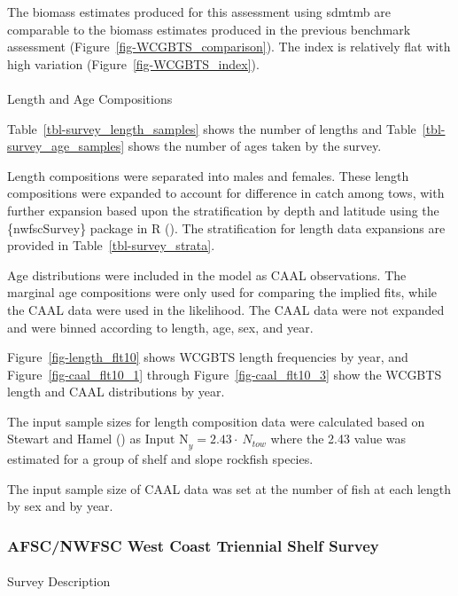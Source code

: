 \documentclass[
]{scrartcl}
\makeatletter
\let\oldparagraph\paragraph
\renewcommand{\paragraph}{
    \@ifstar
      \xxxParagraphStar
      \xxxParagraphNoStar
  }
\newcommand{\xxxParagraphStar}[1]{\oldparagraph*{#1}\mbox{}}
\newcommand{\xxxParagraphNoStar}[1]{\oldparagraph{#1}\mbox{}}
\makeatother
\begin{document}
The biomass estimates produced for this assessment using \gls{sdmtmb}
are comparable to the biomass estimates produced in the previous
benchmark assessment (Figure~\ref{fig-WCGBTS_comparison}). The index is
relatively flat with high variation (Figure~\ref{fig-WCGBTS_index}).

\paragraph{Length and Age
Compositions}\label{length-and-age-compositions}

Table~\ref{tbl-survey_length_samples} shows the number of lengths and
Table~\ref{tbl-survey_age_samples} shows the number of ages taken by the
survey.

Length compositions were separated into males and females. These length
compositions were expanded to account for difference in catch among
tows, with further expansion based upon the stratification by depth and
latitude using the \{nwfscSurvey\} package in R
(). The stratification for length data expansions are provided in
Table~\ref{tbl-survey_strata}.

Age distributions were included in the model as CAAL observations. The
marginal age compositions were only used for comparing the implied fits,
while the CAAL data were used in the likelihood. The CAAL data were not
expanded and were binned according to length, age, sex, and year.

Figure~\ref{fig-length_flt10} shows WCGBTS length frequencies by year,
and Figure~\ref{fig-caal_flt10_1} through Figure~\ref{fig-caal_flt10_3}
show the WCGBTS length and CAAL distributions by year.

The input sample sizes for length composition data were calculated based
on Stewart and Hamel ()
as \(\text{Input N}_{y} = 2.43\cdot \ N_{tow}\) where the 2.43 value was
estimated for a group of shelf and slope rockfish species.

The input sample size of CAAL data was set at the number of fish at each
length by sex and by year.

\subsubsection{AFSC/NWFSC West Coast Triennial Shelf
Survey}\label{afscnwfsc-west-coast-triennial-shelf-survey}

\paragraph{Survey Description}\label{survey-description-1}
\end{document}
